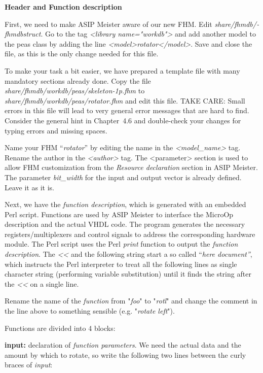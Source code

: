 \documentclass[
]{article}
\begin{document}
\textbf{Header and Function description}

First, we need to make ASIP Meister aware of our new FHM. Edit
\emph{share/­fhmdb/­fhmdbstruct}. Go to the tag \emph{\textless library
name="workdb"\textgreater{}} and add another model to the peas class by
adding the line
\emph{\textless model\textgreater rotator\textless/model\textgreater{}}.
Save and close the file, as this is the only change needed for this
file.

To make your task a bit easier, we have prepared a template file with
many mandatory sections already done. Copy the file
\emph{share/fhmdb/workdb/peas/skeleton-1p.fhm} to
\emph{share/fhmdb/workdb/peas/rotator.fhm} and edit this file. TAKE
CARE: Small errors in this file will lead to very general error messages
that are hard to find. Consider the general hint in Chapter~4.6 and
double-check your changes for typing errors and missing spaces.

Name your FHM ``\emph{rotator}'' by editing the name in the
\emph{\textless model\_name\textgreater{}} tag. Rename the author in the
\emph{\textless author\textgreater{}} tag. The
\textless parameter\textgreater{} section is used to allow FHM
customization from the \emph{Resource declaration} section in ASIP
Meister. The parameter \emph{bit\_width} for the input and output vector
is already defined. Leave it as it is.

Next, we have the \emph{function description}, which is generated with
an embedded Perl script. Functions are used by ASIP Meister to interface
the MicroOp description and the actual VHDL code. The program generates
the necessary registers/multiplexers and control signals to address the
corresponding hardware module. The Perl script uses the Perl
\emph{print} function to output the \emph{function description}. The
\emph{\textless\textless{}} and the following string start a so called
``\emph{here document''}, which instructs the Perl interpreter to treat
all the following lines as single character string (performing variable
substitution) until it finds the string after the
\emph{\textless\textless{}} on a single line.

Rename the name of the \emph{function} from "\emph{foo}" to
"\emph{rotl}" and change the comment in the line above to something
sensible (e.g. "\emph{rotate left}").

Functions are divided into 4 blocks:

\textbf{input:} declaration of \emph{function parameters}. We need the
actual data and the amount by which to rotate, so write the following
two lines between the curly braces of \emph{input}:
\end{document}
